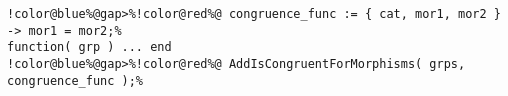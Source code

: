\begin{Verbatim}[commandchars=!@\%,frame=single]
!color@blue%@gap>%!color@red%@ congruence_func := { cat, mor1, mor2 } -> mor1 = mor2;%
function( grp ) ... end
!color@blue%@gap>%!color@red%@ AddIsCongruentForMorphisms( grps, congruence_func );%
\end{Verbatim}

